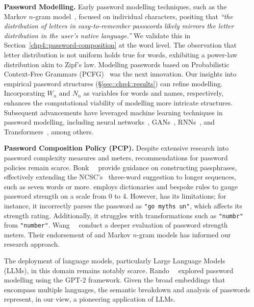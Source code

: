 \textbf{Password Modelling.} Early password modelling techniques, such as the Markov $n$-gram model~\cite{narayanan_fast_2005}, focused on individual characters, positing that \textit{``the distribution of letters in easy-to-remember passwords likely mirrors the letter distribution in the user's native language.''} We validate this in Section~\ref{chp4::password-composition} at the word level. The observation that letter distribution is not uniform holds true for words, exhibiting a power-law distribution akin to Zipf's law. Modelling passwords based on Probabilistic Context-Free Grammars (PCFG)~\cite{weir_password_2009} was the next innovation. Our insights into empirical password structures (\S\ref{sec::chp4::results}) can refine \pcfg modelling. Incorporating $W_n \text{ and } N_n$ as variables for words and names, respectively, enhances the computational viability of modelling more intricate structures. Subsequent advancements have leveraged machine learning techniques in password modelling, including neural networks~\cite{Castro_Lang_Liu_Mata_2017}, GANs~\cite{hitaj_passgan_2019}, RNNs~\cite{Melicher_Ur_Segreti_Komanduri_Bauer_Christin_Cranor_2016}, and Transformers~\cite{Xu_Yu_Zhang_Wang_Zhang_Wu_Han_2023}, among others.

\textbf{Password Composition Policy (PCP).} Despite extensive research into password complexity measures and meters, recommendations for password policies remain scarce. Bonk~\etal~\cite{Bonk_Parish_et_al_2021} provide guidance on constructing passphrases, effectively extending the NCSC's~\cite{ncsc2024} three-word suggestion to longer sequences, such as seven words or more. \zxcvbn employs dictionaries and bespoke rules to gauge password strength on a scale from 0 to 4. However, \zxcvbn has its limitations; for instance, it incorrectly parses the password  as \texttt{"go myths un"}, which affects its strength rating. Additionally, it struggles with transformations such as \texttt{"numbr"} from \texttt{"number"}. Wang~\etal~\cite{Wang_Shan_Dong_Shen_Jia_2023} conduct a deeper evaluation of password strength meters. Their endorsement of \zxcvbn and Markov $n$-gram models has informed our research approach.

The deployment of language models, particularly Large Language Models (LLMs), in this domain remains notably scarce. Rando~\etal~\cite{Rando_Perez-Cruz_Hitaj_2023} explored password modelling using the GPT-2 framework. Given the broad embeddings that encompass multiple languages, the semantic breakdown and analysis of passwords represent, in our view, a pioneering application of LLMs.
